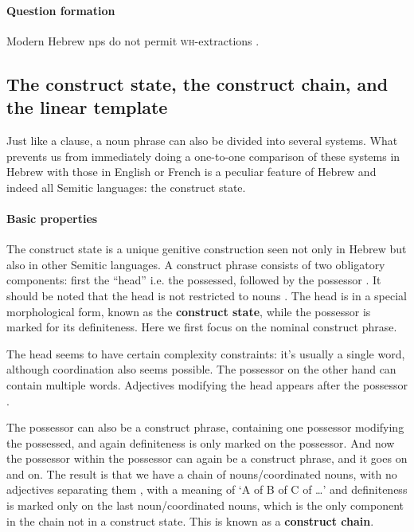 \documentclass[a4paper, oneside, 12pt]{report}
\newcommand*{\citepage}[1]{p.~{#1}}
\newcommand*{\concept}[1]{\textbf{#1}}
\newcommand{\category}[1]{\textsc{#1}}
\newcommand{\translate}[1]{`#1'}
\begin{document}
\paragraph*{Question formation}
Modern Hebrew \acp{np} do not permit \category{wh}-extractions
\citep{shlonsky2012some}.

\subsection{The construct state, the construct chain, and the linear template}

Just like a clause, a noun phrase can also be divided into several systems.
What prevents us from immediately doing a one-to-one comparison of these systems in Hebrew
with those in English or French 
is a peculiar feature of Hebrew and indeed all Semitic languages:
the construct state.

\paragraph*{Basic properties}

The construct state is a unique genitive construction seen not only in Hebrew
but also in other Semitic languages.
A construct phrase consists of two obligatory components:
first the ``head'' i.e. the possessed,
followed by the possessor \citep[\citepage{26}]{glinert2004grammar}.
It should be noted that the head is not restricted to nouns
\citep[\citepage{25}]{glinert2004grammar}. 
The head is in a special morphological form,
known as the \concept{construct state},
while the possessor is marked for its definiteness.
Here we first focus on the nominal construct phrase.

The head seems to have certain complexity constraints:
it's usually a single word, although coordination also seems possible.
The possessor on the other hand can contain multiple words.
Adjectives modifying the head appears after the possessor
\citep[\citepage{25}]{glinert2004grammar}.

The possessor can also be a construct phrase,
containing one possessor modifying the possessed,
and again definiteness is only marked on the possessor.
And now the possessor within the possessor can again be a construct phrase,
and it goes on and on.
The result is that we have a chain of nouns/coordinated nouns,
with no adjectives separating them \citep{borer1999deconstructing},
with a meaning of \translate{A of B of C of \dots}
and definiteness is marked only on the last noun/coordinated nouns,
which is the only component in the chain not in a construct state.
This is known as a \concept{construct chain}.
\end{document}
